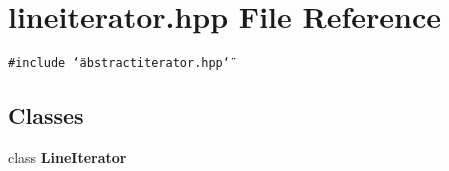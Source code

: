 \section{lineiterator.hpp File Reference}
\label{lineiterator_8hpp}
{\tt \#include \char`\"{}abstractiterator.hpp\char`\"{}}\par
\subsection*{Classes}
\begin{CompactItemize}
\item 
class {\bf Line\-Iterator}
\end{CompactItemize}

